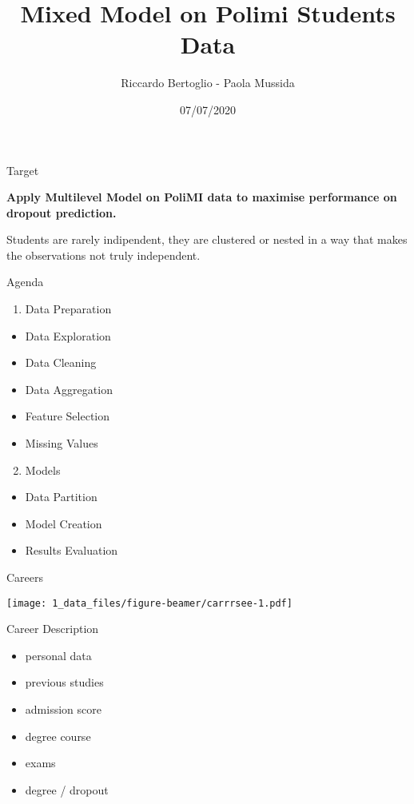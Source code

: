 \documentclass[
  ignorenonframetext,
]{beamer}
\title{Mixed Model on Polimi Students Data}
\author{Riccardo Bertoglio - Paola Mussida}
\date{07/07/2020}
\providecommand{\tightlist}{%
  \setlength{\itemsep}{0pt}\setlength{\parskip}{0pt}}
\begin{document}
\frame{\titlepage}

\begin{frame}{Target}
\protect\hypertarget{target}{}

\textbf{Apply Multilevel Model on PoliMI data to maximise performance on
dropout prediction.}

Students are rarely indipendent, they are clustered or nested in a way
that makes the observations not truly independent.

\end{frame}

\begin{frame}{Agenda}
\protect\hypertarget{agenda}{}

\begin{enumerate}
\tightlist
\item
  Data Preparation
\end{enumerate}

\begin{itemize}
\tightlist
\item
  Data Exploration
\item
  Data Cleaning
\item
  Data Aggregation
\item
  Feature Selection
\item
  Missing Values
\end{itemize}

\begin{enumerate}
\setcounter{enumi}{1}
\tightlist
\item
  Models
\end{enumerate}

\begin{itemize}
\tightlist
\item
  Data Partition
\item
  Model Creation
\item
  Results Evaluation
\end{itemize}

\end{frame}

\begin{frame}{Careers}
\protect\hypertarget{careers}{}

\texttt{[image: 1\_data\_files/figure-beamer/carrrsee-1.pdf]}

\end{frame}

\begin{frame}{Career Description}
\protect\hypertarget{career-description}{}

\begin{itemize}
\item
  personal data
\item
  previous studies
\item
  admission score
\item
  degree course
\item
  exams
\item
  degree / dropout
\end{itemize}

\end{frame}
\end{document}
